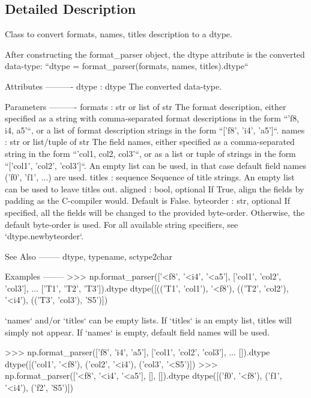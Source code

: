 \subsection{Detailed Description}
\begin{DoxyVerb}Class to convert formats, names, titles description to a dtype.

After constructing the format_parser object, the dtype attribute is
the converted data-type:
``dtype = format_parser(formats, names, titles).dtype``

Attributes
----------
dtype : dtype
    The converted data-type.

Parameters
----------
formats : str or list of str
    The format description, either specified as a string with
    comma-separated format descriptions in the form ``'f8, i4, a5'``, or
    a list of format description strings  in the form
    ``['f8', 'i4', 'a5']``.
names : str or list/tuple of str
    The field names, either specified as a comma-separated string in the
    form ``'col1, col2, col3'``, or as a list or tuple of strings in the
    form ``['col1', 'col2', 'col3']``.
    An empty list can be used, in that case default field names
    ('f0', 'f1', ...) are used.
titles : sequence
    Sequence of title strings. An empty list can be used to leave titles
    out.
aligned : bool, optional
    If True, align the fields by padding as the C-compiler would.
    Default is False.
byteorder : str, optional
    If specified, all the fields will be changed to the
    provided byte-order.  Otherwise, the default byte-order is
    used. For all available string specifiers, see `dtype.newbyteorder`.

See Also
--------
dtype, typename, sctype2char

Examples
--------
>>> np.format_parser(['<f8', '<i4', '<a5'], ['col1', 'col2', 'col3'],
...                  ['T1', 'T2', 'T3']).dtype
dtype([(('T1', 'col1'), '<f8'), (('T2', 'col2'), '<i4'), (('T3', 'col3'), 'S5')])

`names` and/or `titles` can be empty lists. If `titles` is an empty list,
titles will simply not appear. If `names` is empty, default field names
will be used.

>>> np.format_parser(['f8', 'i4', 'a5'], ['col1', 'col2', 'col3'],
...                  []).dtype
dtype([('col1', '<f8'), ('col2', '<i4'), ('col3', '<S5')])
>>> np.format_parser(['<f8', '<i4', '<a5'], [], []).dtype
dtype([('f0', '<f8'), ('f1', '<i4'), ('f2', 'S5')])\end{DoxyVerb}
 

